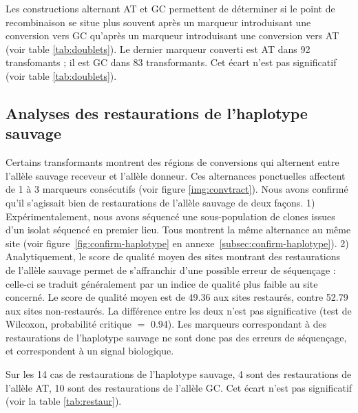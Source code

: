 Les constructions alternant AT et GC permettent de déterminer si le point de
recombinaison se situe plus souvent après un marqueur introduisant une
conversion vers GC qu'après un marqueur introduisant une conversion vers AT
(voir table \ref{tab:doublets}). Le dernier marqueur converti est AT dans 92
transfomants ; il est GC dans 83 transformants. Cet écart n'est pas
significatif (voir table \ref{tab:doublets}).



\subsection{Analyses des restaurations de l'haplotype sauvage}
\label{subsec:restaur}


Certains transformants montrent des régions de conversions qui alternent entre
l'allèle sauvage receveur et l'allèle donneur. Ces alternances ponctuelles
affectent de 1 à 3 marqueurs consécutifs (voir figure \ref{img:convtract}). Nous
avons confirmé qu'il s'agissait bien de restaurations de l'allèle sauvage de
deux façons. 1) Expérimentalement, nous avons séquencé une sous-population de
clones issues d'un isolat séquencé en premier lieu. Tous montrent la même
alternance au même site (voir figure~\ref{fig:confirm-haplotype} en
annexe~\ref{subsec:confirm-haplotype}). 2) Analytiquement, le score de qualité
moyen des sites montrant des restaurations de l'allèle sauvage permet de
s'affranchir d'une possible erreur de séquençage : celle-ci se traduit
généralement par un indice de qualité plus faible au site concerné. Le score de
qualité moyen est de \num{49.36} aux sites restaurés, contre \num{52.79} aux
sites non-restaurés. La différence entre les deux n'est pas significative (test
de Wilcoxon, probabilité critique \(=\) \num{0.94}). Les marqueurs correspondant
à des restaurations de l'haplotype sauvage ne sont donc pas des erreurs de
séquençage, et correspondent à un signal biologique.

Sur les 14 cas de restaurations de l'haplotype sauvage, 4 sont des restaurations
de l'allèle AT, 10 sont des restaurations de l'allèle GC. Cet écart n'est pas
significatif (voir la table \ref{tab:restaur}).

